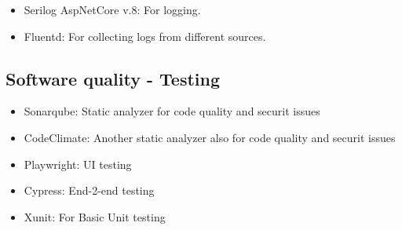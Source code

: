 \begin{itemize}
	\item Serilog AspNetCore v.8: For logging.
	\item Fluentd: For collecting logs from different sources.
\end{itemize}


\subsection*{Software quality - Testing}

\begin{itemize}
	\item Sonarqube: Static analyzer for code quality and securit issues
	\item CodeClimate: Another static analyzer also for code quality and securit issues
	\item Playwright: UI testing
	\item Cypress: End-2-end testing
	\item Xunit: For Basic Unit testing
\end{itemize}

